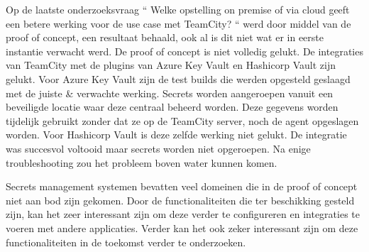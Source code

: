Op de laatste onderzoeksvraag `` Welke opstelling on premise of via cloud geeft een betere werking voor de use case met TeamCity? `` werd door middel van de proof of concept, een resultaat behaald, ook al is dit niet wat er in eerste instantie verwacht werd. De proof of concept is niet volledig gelukt. De integraties van TeamCity met de plugins van Azure Key Vault en Hashicorp Vault zijn gelukt. Voor Azure Key Vault zijn de test builds die werden opgesteld geslaagd met de juiste \& verwachte werking. Secrets worden aangeroepen vanuit een beveiligde locatie waar deze centraal beheerd worden. Deze gegevens worden tijdelijk gebruikt zonder dat ze op de TeamCity server, noch de agent opgeslagen worden. Voor Hashicorp Vault is deze zelfde werking niet gelukt. De integratie was succesvol voltooid maar secrets worden niet opgeroepen. Na enige troubleshooting zou het probleem boven water kunnen komen. 

Secrets management systemen bevatten veel domeinen die in de proof of concept niet aan bod zijn gekomen. Door de functionaliteiten die ter beschikking gesteld zijn, kan het zeer interessant zijn om deze verder te configureren en integraties te voeren met andere applicaties. Verder kan het ook zeker interessant zijn om deze functionaliteiten in de toekomst verder te onderzoeken.